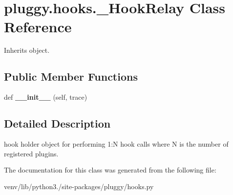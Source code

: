 \hypertarget{classpluggy_1_1hooks_1_1___hook_relay}{}\section{pluggy.\+hooks.\+\_\+\+Hook\+Relay Class Reference}
\label{classpluggy_1_1hooks_1_1___hook_relay}


Inherits object.

\subsection*{Public Member Functions}
\begin{DoxyCompactItemize}
\item 
\mbox{\label{classpluggy_1_1hooks_1_1___hook_relay_ac195a9bf34c6214045098bf80aab233c}} 
def {\bfseries \+\_\+\+\_\+init\+\_\+\+\_\+} (self, trace)
\end{DoxyCompactItemize}


\subsection{Detailed Description}
\begin{DoxyVerb}hook holder object for performing 1:N hook calls where N is the number
of registered plugins.\end{DoxyVerb}
 

The documentation for this class was generated from the following file\+:\begin{DoxyCompactItemize}
\item 
venv/lib/python3./site-\/packages/pluggy/hooks.\+py\end{DoxyCompactItemize}
